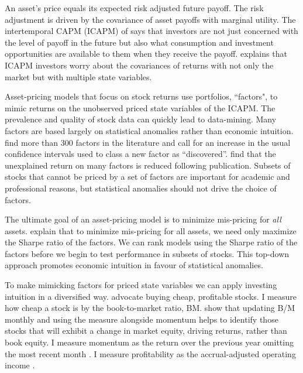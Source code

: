 

An asset’s price equals its expected risk adjusted future payoff. The risk
adjustment is driven by the covariance of asset payoffs with marginal utility.
The intertemporal CAPM (ICAPM) of \textcite{merton1973intertemporal} says that
investors are not just concerned with the level of payoff in the future but
also what consumption and investment opportunities are available to them when
they receive the payoff. \textcite{fama1996multifactor} explains that ICAPM
investors worry about the covariances of returns with not only the market but
with multiple state variables.

Asset-pricing models that focus on stock returns use portfolios, ``factors", to
mimic returns on the unobserved priced state variables of the ICAPM. The
prevalence and quality of stock data can quickly lead to data-mining. Many
factors are based largely on statistical anomalies rather than economic
intuition. \textcite{harvey2016and} find more than 300 factors in the
literature and call for an increase in the usual confidence intervals used to
class a new factor as ``discovered”. \textcite{mclean2016does} find that the
unexplained return on many factors is reduced following publication. Subsets of
stocks that cannot be priced by a set of factors are important for academic and
professional reasons, but statistical anomalies should not drive the choice of
factors.

The ultimate goal of an asset-pricing model is to minimize mis-pricing for
\emph{all} assets.
\textcite{barillas2016alpha} explain that to minimize mis-pricing for all
assets, we need only maximize the Sharpe ratio of the factors.
We can rank models using the Sharpe ratio of the factors before we begin to
test performance in subsets of stocks. This top-down approach promotes economic
intuition in favour of statistical anomalies.

To make mimicking factors for priced state variables we can apply investing
intuition in a diversified way. \textcite{graham1934security} advocate buying
cheap, profitable stocks. I measure how cheap a stock is by the book-to-market
ratio, BM. \textcite{kok2017facts, asness2013devil} show that updating B/M
monthly and using the measure alongside momentum helps to identify those stocks
that will exhibit a change in market equity, driving returns, rather than book
equity. I measure momentum as the return over the previous year omitting the
most recent month \parencite{fama2016dissecting}. I measure profitability as
the accrual-adjusted operating income \parencite{ball2016accruals}.

